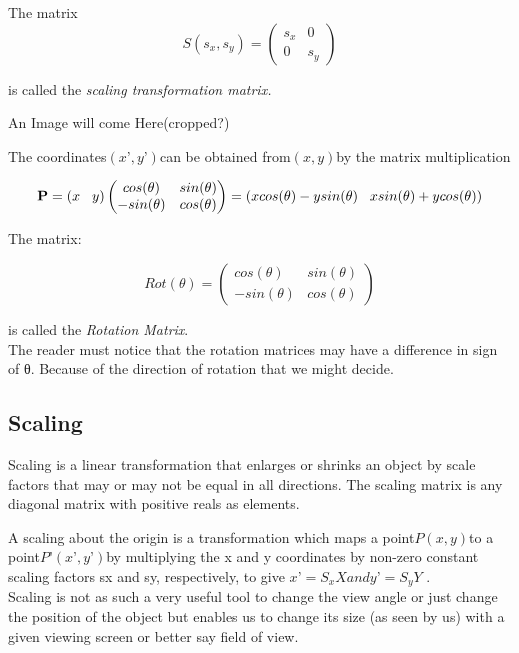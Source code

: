 \documentclass[12pt]{report}
\begin{document}
The matrix
\[ S(s_{x},s_{y}) = \begin{pmatrix}
s_{x} & 0 \\
0 & s_{y}
\end{pmatrix}  \]
\begin{center}
  is called the \textit{scaling transformation matrix.}

  An Image will come Here(cropped?)
  \vspace{4cm}
\end{center}

The coordinates$ (x’ , y’ ) $can be obtained from$ (x, y) $by the matrix multiplication

\[ \textbf{P} = (x \hspace{0.3cm} y) \begin{pmatrix}
cos(\theta) & sin(\theta) \\
-sin(\theta) & cos(\theta)
\end{pmatrix} = (x cos(\theta) - y sin(\theta) \hspace{0.3cm} x sin(\theta) + y cos(\theta) ) \]

The matrix:

\[ Rot(\theta) = \begin{pmatrix}
cos(\theta) & sin(\theta) \\
-sin(\theta) & cos(\theta)
\end{pmatrix} \]

is called the \textit{Rotation Matrix}.\\


The reader must notice that the rotation matrices may have a difference in sign of θ. Because of the direction of rotation that we might decide.\\

\subsection{Scaling}

Scaling is a linear transformation that enlarges or shrinks an object by scale factors that may or may not be equal in all directions. The scaling matrix is any diagonal matrix with positive reals as elements.\\
\vspace{0.3cm}

A scaling about the origin is a transformation which maps a point$ P(x, y) $to a point$ P’ (x’ , y’ ) $by multiplying the x and y coordinates by non-zero constant scaling factors sx and sy, respectively, to give $ x’ = S_{x} X and y’ = S_{y} Y$ .
\vspace{0.3cm}
\\
Scaling is not as such a very useful tool to change the view angle or just change the position of the object but enables us to change its size (as seen by us) with a given viewing screen or better say field of view.
\end{document}
